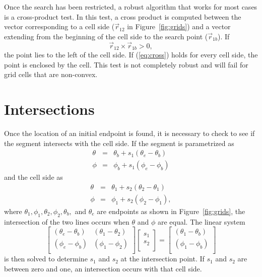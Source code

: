 \documentclass[12pt]{report}
\begin{document}
Once the search has been restricted, a robust algorithm
that works for most cases is a cross-product test.
In this test, a cross product is computed between
the vector corresponding to a cell side ($\vec{r}_{12}$ in
Figure~\ref{fig:grids}) and a vector extending from the
beginning of the cell side to the search point ($\vec{r}_{1b}$).
If
\begin{equation}\label{eq:cross}
\vec{r}_{12} \times \vec{r}_{1b} > 0,
\end{equation}
the point lies to the left of the cell side.  If
(\ref{eq:cross}) holds for every cell side, the
point is enclosed by the cell.
This test is not completely robust and will fail for
grid cells that are non-convex.

\section{Intersections}\label{sec:intersect}

Once the location of an initial endpoint is found,
it is necessary to check to see if the segment intersects
with the cell side.  If the segment is parametrized as
\begin{eqnarray}
\theta &=& \theta_b + s_1 (\theta_e - \theta_b) \nonumber \\
\phi   &=& \phi_b + s_1 (\phi_e - \phi_b)
\end{eqnarray}
and the cell side as
\begin{eqnarray}
\theta &=& \theta_1 + s_2 (\theta_2 - \theta_1) \nonumber \\
\phi   &=& \phi_1 + s_2 (\phi_2 - \phi_1),
\end{eqnarray}
where $\theta_1, \phi_1, \theta_2, \phi_2, \theta_b,$ and
$\theta_e$ are endpoints as shown in Figure~\ref{fig:grids},
the intersection of the two lines occurs when $\theta$
and $\phi$ are equal.  The linear system
\begin{equation}
\left[ \begin{array}{cc}
(\theta_e - \theta_b) & (\theta_1 - \theta_2) \\
(\phi_e - \phi_b) & (\phi_1 - \phi_2) \\
\end{array} \right]
\left[ \begin{array}{c} s_1 \\ s_2 \\ \end{array} \right] =
\left[ \begin{array}{c}
(\theta_1 - \theta_b) \\ (\phi_1 - \phi_b)  \\
\end{array} \right]
\end{equation}
is then solved
to determine $s_1$ and $s_2$ at the intersection point.
If $s_1$ and $s_2$ are between zero and one, an
intersection occurs with that cell side.
\end{document}
